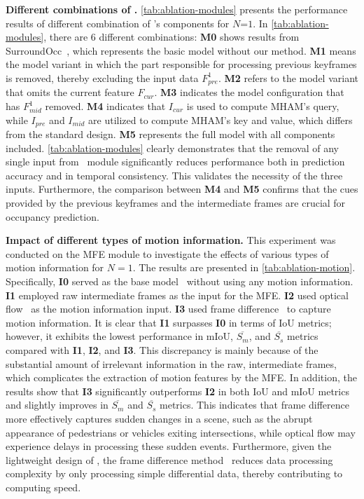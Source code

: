 \noindent\textbf{Different combinations of \ours.} \label{para:aba-comb}\cref{tab:ablation-modules} presents the performance results of different combination of \ours's components for $N$=$1$. In \cref{tab:ablation-modules}, there are 6 different combinations: \textbf{M0} shows results from SurroundOcc~\cite{surroundOcc}, which represents the basic model without our method. \textbf{M1} means the model variant in which the part responsible for processing previous keyframes is removed, thereby excluding the input data \(F_{pre}^{1}\). \textbf{M2} refers to the model variant that omits the current feature \(F_{cur}\). \textbf{M3} indicates the model configuration that has \(F_{mid}^{1}\) removed. \textbf{M4} indicates that $I_{cur}$ is used to compute MHAM's query, while $I_{pre}$ and $I_{mid}$ are utilized to compute MHAM's key and value, which differs from the standard design. \textbf{M5} represents the full model with all components included.
\cref{tab:ablation-modules} clearly demonstrates that the removal of any single input from \ours\ module significantly reduces performance both in prediction accuracy and in temporal consistency. This validates the necessity of the three inputs. Furthermore, the comparison between \textbf{M4} and \textbf{M5} confirms that the cues provided by the previous keyframes and the intermediate frames are crucial for occupancy prediction.

\noindent\textbf{Impact of different types of motion information.} \label{para:motion-extracting} This experiment was conducted on the MFE module to investigate the effects of various types of motion information for $N=1$. The results are presented in \cref{tab:ablation-motion}. Specifically, \textbf{I0} served as the base model~\cite{surroundOcc} without using any motion information. \textbf{I1} employed raw intermediate frames as the input for the MFE. \textbf{I2} used optical flow~\cite{OpticalFlow} as the motion information input. \textbf{I3} used frame difference~\cite{Frame_difference} to capture motion information. It is clear that \textbf{I1} surpasses \textbf{I0} in terms of IoU metrics; however, it exhibits the lowest performance in mIoU, $\overline{S_m}$, and $\overline{S_s}$ metrics compared with \textbf{I1}, \textbf{I2}, and \textbf{I3}. This discrepancy is mainly because of the substantial amount of irrelevant information in the raw, intermediate frames, which complicates the extraction of motion features by the MFE. In addition, the results show that \textbf{I3} significantly outperforms \textbf{I2} in both IoU and mIoU metrics and slightly improves in $\overline{S_m}$ and $\overline{S_s}$ metrics. This indicates that frame difference more effectively captures sudden changes in a scene, such as the abrupt appearance of pedestrians or vehicles exiting intersections, while optical flow may experience delays in processing these sudden events. Furthermore, given the lightweight design of \ours, the frame difference method~\cite{Frame_difference} reduces data processing complexity by only processing simple differential data, thereby contributing to computing speed.

